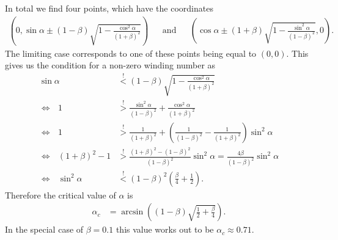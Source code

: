 \documentclass[english, parskip=full]{scrartcl}
\newcommand{\kla}{}
\newcommand{\klam}{}
\newcommand{\tecxt}{}
\begin{document}
In total we find four points, which have the coordinates
\begin{align}
\kla\left( 0, \sin\alpha \pm(1-\beta)\sqrt{1-\frac{\cos^2\alpha}{(1+\beta)^2}} \right)&&\tecxt\text{and}&&\kla\left( \cos\alpha \pm (1+\beta)\sqrt{1-\frac{\sin^2\alpha}{(1-\beta)^2}}, 0 \right).
\end{align}
The limiting case corresponds to one of these points being equal to $(0,0)$. 
This gives us the condition for a non-zero winding number as
\begin{align}
\sin\alpha&\overset{!}{<}(1-\beta)\sqrt{1-\frac{\cos^2\alpha}{(1+\beta)^2}}\\
\Leftrightarrow\ \ \ 1&\overset{!}{>}\frac{\sin^2\alpha}{(1-\beta)^2}+\frac{\cos^2\alpha}{(1+\beta)^2}\\
\Leftrightarrow\ \ \ 1&\overset{!}{>}\frac{1}{(1+\beta)^2} + \kla\left( \frac{1}{(1-\beta)^2} - \frac{1}{(1+\beta)^2} \right)\sin^2\alpha\\
\Leftrightarrow\ \ \ (1+\beta)^2-1&\overset{!}{>}\frac{(1+\beta)^2-(1-\beta)^2}{(1-\beta)^2}\sin^2\alpha=\frac{4\beta}{(1-\beta)^2}\sin^2\alpha\\
\Leftrightarrow\ \ \ \sin^2\alpha&\overset{!}{<}(1-\beta)^2\kla\left( \frac{\beta}{4}+\frac{1}{2} \right).
\end{align}
Therefore the critical value of $\alpha$ is
\begin{align}
\alpha_c&=\arcsin\kla\left( (1-\beta)\sqrt{\frac{1}{2}+\frac{\beta}{4}} \right).
\end{align}
In the special case of $\beta=0.1$ this value works out to be $\alpha_c\approx 0.71$.
\end{document}
